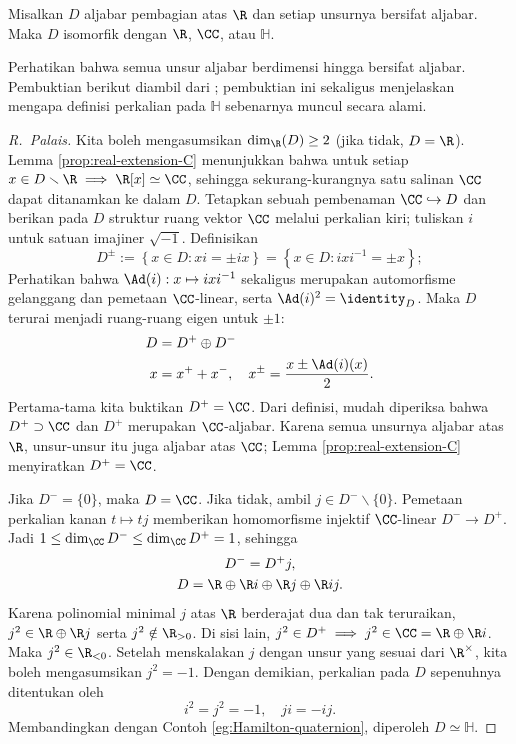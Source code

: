 \begin{theorem}[F.\ G.\ Frobenius, 1877]\label{prop:division-R-algebra}
	Misalkan $D$ aljabar pembagian atas $\R$ dan setiap unsurnya bersifat aljabar. Maka $D$ isomorfik dengan $\R$, $\CC$, atau $\mathbb{H}$.
\end{theorem}
Perhatikan bahwa semua unsur aljabar berdimensi hingga bersifat aljabar. Pembuktian berikut diambil dari \cite[(13.12)]{Lam01}; pembuktian ini sekaligus menjelaskan mengapa definisi perkalian pada $\mathbb{H}$ sebenarnya muncul secara alami.
\begin{proof}[R.\ Palais]
	Kita boleh mengasumsikan $\dim_{\R}(D) \geq 2$ (jika tidak, $D=\R$). Lemma \ref{prop:real-extension-C} menunjukkan bahwa untuk setiap $x \in D \smallsetminus \R \implies \R[x] \simeq \CC$, sehingga sekurang-kurangnya satu salinan $\CC$ dapat ditanamkan ke dalam $D$. Tetapkan sebuah pembenaman $\CC \hookrightarrow D$ dan berikan pada $D$ struktur ruang vektor $\CC$ melalui perkalian kiri; tuliskan $i$ untuk satuan imajiner $\sqrt{-1}$. Definisikan
	\[ D^\pm := \left\{ x \in D : xi = \pm ix \right\} = \left\{ x \in D: ixi^{-1} = \pm x \right\}; \]
	Perhatikan bahwa $\Ad(i): x \mapsto ixi^{-1}$ sekaligus merupakan automorfisme gelanggang dan pemetaan $\CC$-linear, serta $\Ad(i)^2 = \identity_D$. Maka $D$ terurai menjadi ruang-ruang eigen untuk $\pm 1$:
	\begin{align*}
		D & = D^+ \oplus D^- \\
		x & = x^+ + x^-, \quad x^\pm = \frac{x \pm \Ad(i)(x)}{2}.
	\end{align*}
	Pertama-tama kita buktikan $D^+ = \CC$. Dari definisi, mudah diperiksa bahwa $D^+ \supset \CC$ dan $D^+$ merupakan $\CC$-aljabar. Karena semua unsurnya aljabar atas $\R$, unsur-unsur itu juga aljabar atas $\CC$; Lemma \ref{prop:real-extension-C} menyiratkan $D^+ = \CC$.

	Jika $D^- = \{0\}$, maka $D = \CC$. Jika tidak, ambil $j \in D^- \smallsetminus \{0\}$. Pemetaan perkalian kanan $t \mapsto tj$ memberikan homomorfisme injektif $\CC$-linear $D^- \to D^+$. Jadi $1 \leq \dim_{\CC} D^- \leq \dim_{\CC} D^+ = 1$, sehingga
	\begin{gather*}
		D^- = D^+ j, \\
		D = \R \oplus \R i \oplus \R j \oplus \R ij.
	\end{gather*}
	Karena polinomial minimal $j$ atas $\R$ berderajat dua dan tak teruraikan, $j^2 \in \R \oplus \R j$ serta $j^2 \notin \R_{>0}$. Di sisi lain, $j^2 \in D^+ \implies j^2 \in \CC = \R \oplus \R i$. Maka $j^2 \in \R_{<0}$. Setelah menskalakan $j$ dengan unsur yang sesuai dari $\R^\times$, kita boleh mengasumsikan $j^2 = -1$. Dengan demikian, perkalian pada $D$ sepenuhnya ditentukan oleh
	\[ i^2 = j^2 = -1, \quad ji=-ij. \]
	Membandingkan dengan Contoh \ref{eg:Hamilton-quaternion}, diperoleh $D \simeq \mathbb{H}$.
\end{proof}
